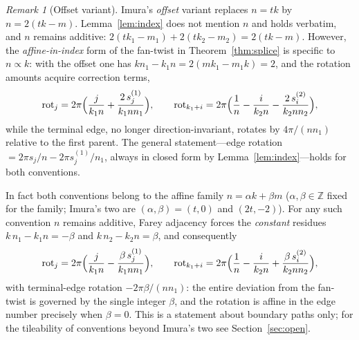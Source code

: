 \documentclass[11pt]{article}
\theoremstyle{remark}
\newtheorem{remark}[theorem]{Remark}
\theoremstyle{definition}
\begin{document}
\begin{remark}[Offset variant]\label{rem:offset}
Imura's \emph{offset} variant replaces $n=tk$ by $n=2(tk-m)$. Lemma~\ref{lem:index} does
not mention $n$ and holds verbatim, and $n$ remains additive:
$2(tk_1-m_1)+2(tk_2-m_2)=2(tk-m)$. However, the \emph{affine-in-index} form of the
fan-twist in Theorem~\ref{thm:splice} is specific to $n\propto k$: with the offset one has
$k n_1 - k_1 n = 2(mk_1-m_1k)=2$, and the rotation amounts acquire correction terms,
\[
\mathrm{rot}_j = 2\pi\Bigl(\frac{j}{k_1 n} + \frac{2\,s^{(1)}_j}{k_1 n n_1}\Bigr),
\qquad
\mathrm{rot}_{k_1+i} = 2\pi\Bigl(\frac{1}{n} - \frac{i}{k_2 n}
 - \frac{2\,s^{(2)}_i}{k_2 n n_2}\Bigr),
\]
while the terminal edge, no longer direction-invariant, rotates by $4\pi/(n n_1)$
relative to the first parent. The general statement---edge rotation
$=2\pi s_j/n - 2\pi s^{(1)}_j/n_1$, always in closed form by
Lemma~\ref{lem:index}---holds for both conventions.

In fact both conventions belong to the affine family $n=\alpha k+\beta m$
($\alpha,\beta\in\mathbb{Z}$ fixed for the family; Imura's two are
$(\alpha,\beta)=(t,0)$ and $(2t,-2)$). For any such convention $n$ remains additive,
Farey adjacency forces the \emph{constant} residues $k\,n_1-k_1 n=-\beta$ and
$k\,n_2-k_2 n=\beta$, and consequently
\[
\mathrm{rot}_j = 2\pi\Bigl(\frac{j}{k_1 n} - \frac{\beta\,s^{(1)}_j}{k_1 n n_1}\Bigr),
\qquad
\mathrm{rot}_{k_1+i} = 2\pi\Bigl(\frac{1}{n} - \frac{i}{k_2 n}
 + \frac{\beta\,s^{(2)}_i}{k_2 n n_2}\Bigr),
\]
with terminal-edge rotation $-2\pi\beta/(n n_1)$: the entire deviation from the
fan-twist is governed by the single integer $\beta$, and the rotation is affine in
the edge number precisely when $\beta=0$. This is a statement about boundary paths
only; for the tileability of conventions beyond Imura's two see
Section~\ref{sec:open}.
\end{remark}
\end{document}
